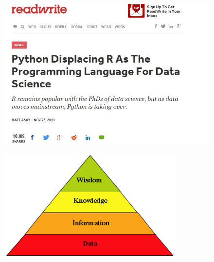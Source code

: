 \begin{frame}
	\begin{figure}
		\centering
		\includegraphics[width=1.05\linewidth]{mjasay}
		
	\end{figure}
	
\end{frame}
\begin{frame}
	\begin{figure}
		\centering
		\includegraphics[width=0.9\linewidth]{KnowledgePyramid}
		
	\end{figure}
	
\end{frame}


